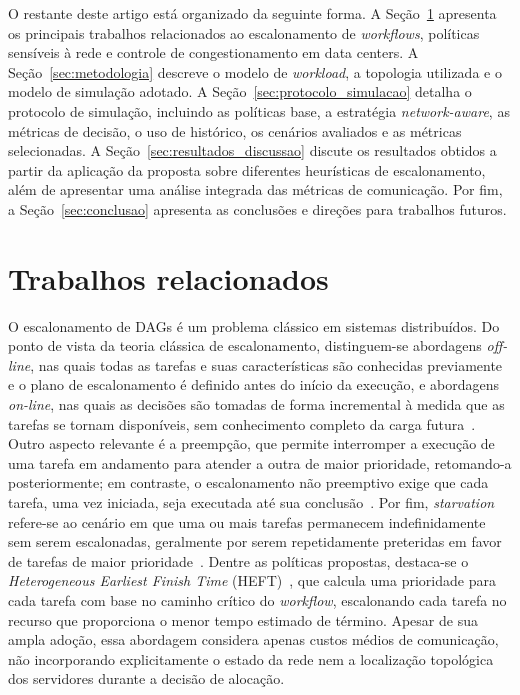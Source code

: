 \documentclass[12pt]{article}
\begin{document}
O restante deste artigo está organizado da seguinte forma. 
%
A Seção~\ref{sec:trabalhos_relacionados} apresenta os principais trabalhos relacionados ao escalonamento de \textit{workflows}, políticas sensíveis à rede e controle de congestionamento em data centers. 
%
A Seção~\ref{sec:metodologia} descreve o modelo de \textit{workload}, a topologia utilizada e o modelo de simulação adotado. 
%
A Seção~\ref{sec:protocolo_simulacao} detalha o protocolo de simulação, incluindo as políticas base, a estratégia \textit{network-aware}, as métricas de decisão, o uso de histórico, os cenários avaliados e as métricas selecionadas. 
%
A Seção~\ref{sec:resultados_discussao} discute os resultados obtidos a partir da aplicação da proposta sobre diferentes heurísticas de escalonamento, além de apresentar uma análise integrada das métricas de comunicação. 
%
Por fim, a Seção~\ref{sec:conclusao} apresenta as conclusões e direções para trabalhos futuros.





\section{Trabalhos relacionados}
\label{sec:trabalhos_relacionados}

O escalonamento de DAGs é um problema clássico em sistemas distribuídos.
%
Do ponto de vista da teoria clássica de escalonamento, distinguem-se abordagens \textit{off-line}, nas quais todas as tarefas e suas características são conhecidas previamente e o plano de escalonamento é definido antes do início da execução, e abordagens \textit{on-line}, nas quais as decisões são tomadas de forma incremental à medida que as tarefas se tornam disponíveis, sem conhecimento completo da carga futura~\cite{graham1979optimization,pinedo2016scheduling}.
%
Outro aspecto relevante é a preempção, que permite interromper a execução de uma tarefa em andamento para atender a outra de maior prioridade, retomando-a posteriormente; em contraste, o escalonamento não preemptivo exige que cada tarefa, uma vez iniciada, seja executada até sua conclusão~\cite{graham1979optimization,pinedo2016scheduling}.
%
Por fim, \textit{starvation} refere-se ao cenário em que uma ou mais tarefas permanecem indefinidamente sem serem escalonadas, geralmente por serem repetidamente preteridas em favor de tarefas de maior prioridade~\cite{pinedo2016scheduling}.
%
Dentre as políticas propostas, destaca-se o \textit{Heterogeneous Earliest Finish Time} (HEFT)~\cite{topcuoglu2002performance}, que calcula uma prioridade para cada tarefa com base no caminho crítico do \textit{workflow}, escalonando cada tarefa no recurso que proporciona o menor tempo estimado de término. 
%
Apesar de sua ampla adoção, essa abordagem considera apenas custos médios de comunicação, não incorporando explicitamente o estado da rede nem a localização topológica dos servidores durante a decisão de alocação.
\end{document}
